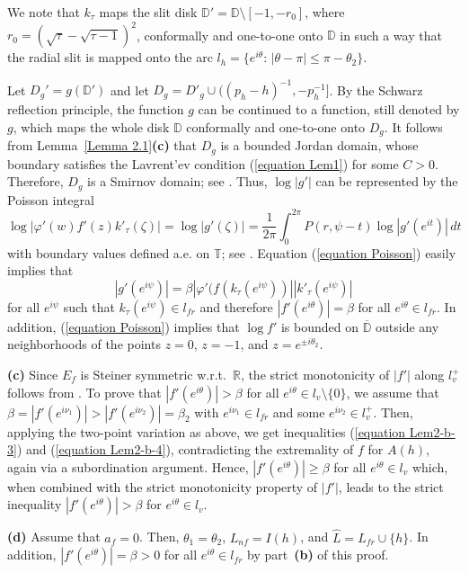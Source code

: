 \documentclass[mn,a4paper,fleqn]{w-art}
\newcommand{\be}{\begin{equation}}
\newcommand{\ee}{\end{equation}}
\newcommand{\R}{{\mathbb R}}
\newcommand{\T}{{\mathbb T}}
\begin{document}
{We note that $k_\tau$ maps the slit disk
$\mathbb{D}'=\mathbb{D}\setminus[-1,-r_0]$, where
$r_0=(\sqrt{\tau}-\sqrt{\tau-1})^2$, conformally and one-to-one
onto $\mathbb{D}$ in such a way  that the radial slit is mapped
onto the arc $l_h=\{e^{i\theta}:\,|\theta-\pi|\le \pi-\theta_2\}$.


Let $D_g'=g(\mathbb{D}')$ and let $D_g=D'_g\cup
((p_h-h)^{-1},-p_h^{-1}]$. By the Schwarz reflection principle,
the function $g$ can be continued to a function, still denoted by
$g$, which maps the whole disk $\mathbb{D}$ conformally and
one-to-one onto $D_g$. It follows from Lemma~\ref{Lemma
2.1}\textbf{(c)} that $D_g$ is a bounded Jordan domain, whose
boundary satisfies the Lavrent'ev condition (\ref{equation Lem1})
for some $C>0$. Therefore, $D_g$ is a Smirnov domain; see
\cite[Sections~7.3, 7.4]{P}.
Thus, $\log |g'|$ can be represented by the Poisson integral %
\be  \label{equation Poisson}%
\log |\varphi'(w)f'(z)k'_\tau(\zeta)|=\log|g'(\zeta)|=\frac{1}{2\pi}\int_0^{2\pi}P(r,\psi-t)%
\log|g'(e^{it})|\, dt %
\ee   %
with boundary values defined a.e. on $\T$; see \cite[p. 155]{P}.
Equation (\ref{equation Poisson}) easily implies that
$$|g'(e^{i\psi})|=\beta |\varphi'(f(k_\tau(e^{i\psi}))||k'_\tau(e^{i\psi})|$$ 
for all $e^{i\psi}$ such that $k_\tau(e^{i\psi})\in l_{fr}$ and therefore
$|f'(e^{i\theta})|=\beta$ for all $e^{i\theta}\in l_{fr}$.  In
addition, (\ref{equation Poisson}) implies that $\log f'$ is
bounded on $\overline{\mathbb{D}}$ outside any neighborhoods of
the points $z=0$, $z=-1$, and $z=e^{\pm i\theta_2}$.

\smallskip



\textbf{(c)} Since $E_f$ is Steiner symmetric w.r.t.\  $\R$, the
strict monotonicity of $|f'|$ along $l_v^+$ follows from
\cite[Lemma~4]{BS}. To prove that $|f'(e^{i\theta})|>\beta$ for
all $e^{i\theta}\in l_v\setminus\{0\}$, we assume that
$\beta=|f'(e^{i\nu_1})|>|f'(e^{i\nu_2})|=\beta_2$ with
$e^{i\nu_1}\in l_{fr}$ and some $e^{i\nu_2}\in l_v^+$.  Then,
applying the two-point variation as above, we get inequalities
(\ref{equation Lem2-b-3}) and (\ref{equation Lem2-b-4}), contradicting the
extremality of $f$ for $A(h)$, again via a subordination argument.
Hence, $|f'(e^{i\theta})|\ge \beta$ for all $e^{i\theta}\in l_v$
which, when combined with the strict monotonicity property of
$|f'|$, leads to the strict inequality $|f'(e^{i\theta})|>\beta$
for $e^{i\theta}\in l_v$.

\smallskip

\textbf{(d)} Assume that $a_f=0$. Then, $\theta_1=\theta_2$,
$L_{nf}=I(h)$, and $\hat L=L_{fr}\cup \{h\}$. In addition,
$|f'(e^{i\theta})|=\beta>0$ for all $e^{i\theta}\in l_{fr}$ by
part~\textbf{(b)} of this proof.

}
\end{document}
